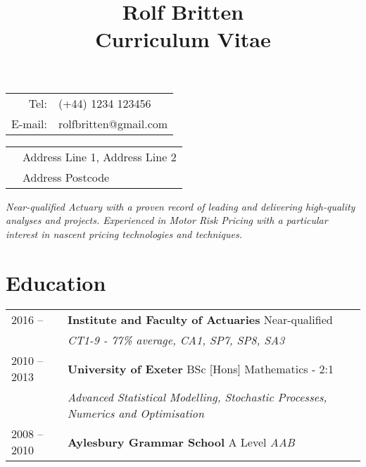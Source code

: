 \documentclass[11pt]{article}
\title{\bfseries \Huge Rolf Britten \\ \Large Curriculum Vitae}
\date{}
\begin{document}
\vspace{-20mm}
\maketitle
\vspace{-20mm}
\begin{minipage}[ht]{0.48\textwidth}
\begin{tabular}{r l}
Tel: & (+44) 1234 123456\\
E-mail: & rolfbritten@gmail.com\\
\end{tabular}
\end{minipage}
\begin{minipage}[ht]{0.48\textwidth}
\begin{tabular}{l l}
& Address Line 1, Address Line 2\\
& Address Postcode\
\end{tabular}
\end{minipage}

\begin{center} \emph{ Near-qualified Actuary with a proven record of leading and delivering high-quality analyses and projects. Experienced in Motor Risk Pricing with a particular interest in nascent pricing technologies and techniques.} \end{center}

\section*{Education}
\begin{tabular}{l | l l}
2016 --  & \textbf{Institute and Faculty of Actuaries} Near-qualified \\
& \hspace{4mm} \textit{CT1-9 - 77\% average, CA1, SP7, SP8, SA3} \\
2010 -- 2013 & \textbf{University of Exeter} BSc [Hons] Mathematics - 2:1\\
& \hspace{4mm} \textit{Advanced Statistical Modelling, Stochastic Processes, Numerics and Optimisation }\\
2008 -- 2010 & \textbf{Aylesbury Grammar School} A Level \textit{AAB} \\
\end{tabular}
\end{document}
